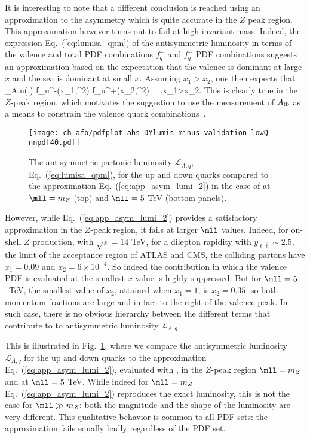 It is interesting to note that a different conclusion is reached using
an approximation to the asymmetry which is quite accurate  in the $Z$
peak region.
%
This approximation however turns out to fail at high
invariant mass.
%
Indeed, the expression Eq.~(\ref{eq:lumisa_qpm}) of the antisymmetric
luminosity in terms of the valence 
and total PDF combinations $f_q^+$ and $f_q^-$ PDF combinations
suggests an approximation based on the expectation
that the valence is dominant at large $x$ and the sea is dominant at
small $x$. Assuming $x_1> x_2$, one then expects that
\be
{}_{A,u}(\yll,\mll) \approx{} f_u^-(x_1,\mll^2)
f_{u}^+(x_2,\mll^2)   \,  \, ,\quad x_1>x_2.
\label{eq:app_asym_lumi_2}
\ee
This is clearly true  in the $Z$-peak region, which  motivates the
suggestion to use the measurement of $A_{\rm fb}$ as a means to
 constrain the valence quark combinations~\cite{Accomando:2019vqt}.

\begin{figure}[!t]
 \centering
 \texttt{[image: ch-afb/pdfplot-abs-DYlumis-minus-validation-lowQ-nnpdf40.pdf]}
 \caption{The  antisymmetric partonic luminosity $\mathcal{L}_{A,q}$, Eq.~(\ref{eq:lumisa_qpm}),
for the up and down quarks 
compared to the approximation 
Eq.~(\ref{eq:app_asym_lumi_2}) in the case of 
at $\mll=m_Z$ (top)
and $\mll=5$ TeV (bottom panels).
 }    
 \label{fig:pdfplot-abs-DYlumis-minus-validation-lowQ-nnpdf40}
\end{figure}

However, while Eq.~(\ref{eq:app_asym_lumi_2}) provides
a satisfactory approximation in the  $Z$-peak region,
it fails  at larger $\mll$ values. Indeed, for on-shell $Z$
production, with $\sqrt{s}=14$ TeV,
for a dilepton rapidity with $y_{\ell\bar{\ell}}\sim 2.5$, the limit of the
acceptance region
of ATLAS and CMS, the colliding partons have
$x_1=0.09$ and $x_2=6\times 10^{-4}$. So indeed the contribution in
which the valence PDF is evaluated at the smallest $x$ value is highly suppressed.
%
But for $\mll=5$~TeV, the smallest value of $x_2$, attained when
$x_1=1$, is $x_2=0.35$: so both momentum fractions are large and in fact
to the right of the valence peak.
%
In such case, there 
is no obvious hierarchy between
the different terms that contribute to to antisymmetric
luminosity $\mathcal{L}_{A,q}$.

This is illustrated in
Fig.~\ref{fig:pdfplot-abs-DYlumis-minus-validation-lowQ-nnpdf40},
where we compare the antisymmetric luminosity $\mathcal{L}_{A,q}$
for the up and down quarks 
to the approximation
Eq.~(\ref{eq:app_asym_lumi_2}), evaluated with  \nnlo,
in the $Z$-peak region $\mll=m_Z$ 
and at $\mll=5$ TeV.
%
While indeed for $\mll=m_Z$ Eq.~(\ref{eq:app_asym_lumi_2}) reproduces
the exact luminosity, this is not the case for $\mll\gg m_Z$: both
the magnitude and the shape of the luminosity are  very different.
%
This qualitative behavior is common to all PDF sets: the approximation
fails equally badly regardless of the PDF set.

